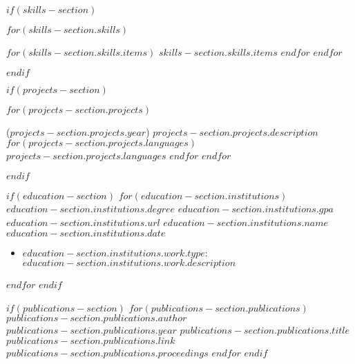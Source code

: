 $if(skills-section)$
\vspace{-13pt}
\begin{description}[align=right,labelwidth=\skillswidth]
\setlength\itemsep{-2pt}
$for(skills-section.skills)$
    \item [$skills-section.skills.heading$:]
    \commasep{\ensuremath{\cdot}}
    $for(skills-section.skills.items)$
        $skills-section.skills.items$
    $endfor$
    \endcommasep
$endfor$
\end{description}
$endif$

$if(projects-section)$
\vspace{-15pt}
\begin{description}[align=left]
\setlength\itemsep{0pt}
$for(projects-section.projects)$
\item
[$projects-section.projects.name$]
($projects-section.projects.year$)
$projects-section.projects.description$
\hfill \commasep{\ensuremath{\cdot}}
    $for(projects-section.projects.languages)$
       $projects-section.projects.languages$
    $endfor$
    \endcommasep
$endfor$
\end{description}
\vspace{-10pt}
$endif$

$if(education-section)$
$for(education-section.institutions)$
    \education
    {$education-section.institutions.degree$}
    {$education-section.institutions.gpa$}
    {$education-section.institutions.url$}
    {$education-section.institutions.name$}
    {$education-section.institutions.date$}
    \begin{itemize}[label=\textcolor{gray}{\textbullet}]
    \setlength\itemsep{0pt}
    \item
      $education-section.institutions.work.type$:
      $education-section.institutions.work.description$
    \end{itemize}
$endfor$
$endif$
\vspace{-15pt}

$if(publications-section)$
$for(publications-section.publications)$
\vspace{-15pt}
\publication
{$publications-section.publications.author$}
{$publications-section.publications.year$}
{$publications-section.publications.title$}
{$publications-section.publications.link$}
{$publications-section.publications.proceedings$}
$endfor$
$endif$



